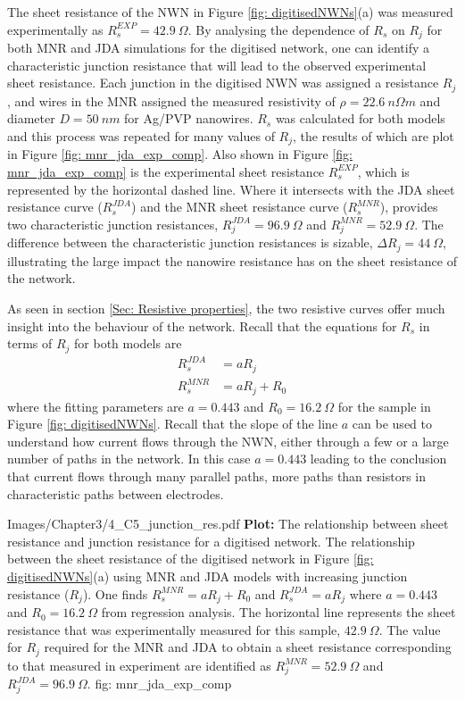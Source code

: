 The sheet resistance of the NWN in Figure \ref{fig: digitisedNWNs}(a) was measured experimentally as $R_s^{EXP} = 42.9 ~ \Omega$. By analysing the dependence of $R_s$ on $R_j$ for both MNR and JDA simulations for the digitised network, one can identify a characteristic junction resistance that will lead to the observed experimental sheet resistance. Each junction in the digitised NWN was assigned a resistance $R_j$, and wires in the MNR assigned the measured resistivity of $\rho = 22.6 ~ n \Omega m$ and diameter $D = 50 ~ nm$ for Ag/PVP nanowires. $R_s$ was calculated for both models and this process was repeated for many values of $R_j$, the results of which are plot in Figure \ref{fig: mnr_jda_exp_comp}. Also shown in Figure \ref{fig: mnr_jda_exp_comp} is the experimental sheet resistance $R_s^{EXP}$, which is represented by the horizontal dashed line. Where it intersects with the JDA sheet resistance curve ($R_s^{JDA}$) and the MNR sheet resistance curve ($R_s^{MNR}$), provides two characteristic junction resistances, $R_j^{JDA} = 96.9 ~ \Omega$ and $R_j^{MNR} = 52.9 ~ \Omega$. The difference between the characteristic junction resistances is sizable, $\Delta R_j = 44~\Omega$, illustrating the large impact the nanowire resistance has on the sheet resistance of the network.

As seen in section \ref{Sec: Resistive properties}, the two resistive curves offer much insight into the behaviour of the network. Recall that the equations for $R_s$ in terms of $R_j$ for both models are
\begin{align}
R_s^{JDA} &= a R_j\nonumber\\
R_s^{MNR} &= a R_j+ R_0
\label{eq: rs_linear}
\end{align}
where the fitting parameters are $a = 0.443$ and $R_0 = 16.2 ~ \Omega$ for the sample in Figure \ref{fig: digitisedNWNs}. Recall that the slope of the line $a$ can be used to understand how current flows through the NWN, either through a few or a large number of paths in the network. In this case $a = 0.443$ leading to the conclusion that current flows through many parallel paths, more paths than resistors in characteristic paths between electrodes. 

{Images/Chapter3/4_C5_junction_res.pdf}
{\textbf{Plot:} The relationship between sheet resistance and junction resistance for a digitised network.}
{The relationship between the sheet resistance of the digitised network in Figure \ref{fig: digitisedNWNs}(a) using MNR and JDA models with increasing junction resistance ($R_j$). One finds $R_s^{MNR} = a R_j + R_0$ and $R_s^{JDA} = a R_j$ where $a = 0.443$ and $R_0 = 16.2 ~ \Omega$ from regression analysis. The horizontal line represents the sheet resistance that was experimentally measured for this sample, $42.9 ~ \Omega$. The value for $R_j$ required for the MNR and JDA to obtain a sheet resistance corresponding to that measured in experiment are identified as $R_j^{MNR} = 52.9 ~ \Omega$ and $R_j^{JDA} = 96.9 ~ \Omega$.}
{fig: mnr_jda_exp_comp}

